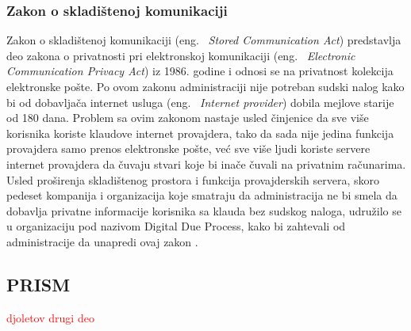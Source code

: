 \documentclass[a4paper]{article}
\newcommand\todos[1]{\textcolor{red}{#1}}
\begin{document}
\subsubsection{Zakon o skladištenoj komunikaciji}
Zakon o skladištenoj komunikaciji (eng. ~{\em Stored Communication Act}) predstavlja deo zakona o privatnosti pri elektronskoj komunikaciji (eng. ~{\em Electronic Communication Privacy Act}) iz 1986. godine i odnosi se na privatnost kolekcija elektronske pošte. Po ovom zakonu administraciji nije potreban sudski nalog kako bi od dobavljača internet usluga (eng. ~{\em Internet provider})  dobila mejlove starije od 180 dana. Problem sa ovim zakonom nastaje usled činjenice da sve više korisnika koriste klaudove internet provajdera, tako da sada nije jedina funkcija provajdera samo prenos elektronske pošte, već sve više ljudi koriste servere internet provajdera da čuvaju stvari koje bi inače čuvali na privatnim računarima. Usled proširenja skladištenog prostora i funkcija provajderskih servera, skoro pedeset kompanija i organizacija koje smatraju da administracija ne bi smela da dobavlja privatne informacije korisnika sa klauda bez sudskog naloga, udružilo se u organizaciju pod nazivom Digital Due Process, kako bi zahtevali od administracije da unapredi ovaj zakon \cite{ddp}.



\subsection{PRISM}
\label{subsec:prism}


\todos{ djoletov drugi deo}
\end{document}
